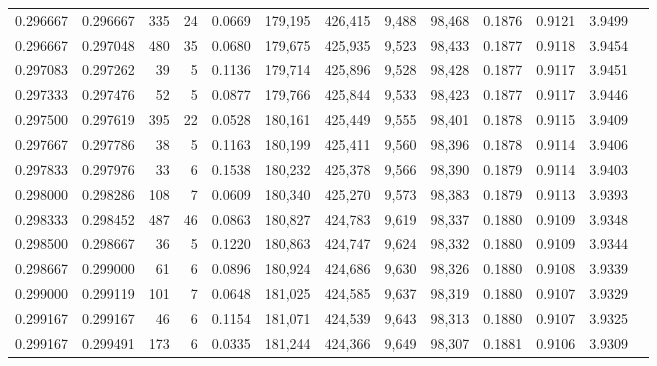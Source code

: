 \begin{tabular}{rrrrrrrrrrrrr}
0.296667 & 0.296667 &   335 &  24 &                                     0.0669 & 179,195 & 426,415 &   9,488 &  98,468 & 0.1876 & 0.9121 & 3.9499 \\
0.296667 & 0.297048 &   480 &  35 &                                     0.0680 & 179,675 & 425,935 &   9,523 &  98,433 & 0.1877 & 0.9118 & 3.9454 \\
0.297083 & 0.297262 &    39 &   5 &                                     0.1136 & 179,714 & 425,896 &   9,528 &  98,428 & 0.1877 & 0.9117 & 3.9451 \\
0.297333 & 0.297476 &    52 &   5 &                                     0.0877 & 179,766 & 425,844 &   9,533 &  98,423 & 0.1877 & 0.9117 & 3.9446 \\
0.297500 & 0.297619 &   395 &  22 &                                     0.0528 & 180,161 & 425,449 &   9,555 &  98,401 & 0.1878 & 0.9115 & 3.9409 \\
0.297667 & 0.297786 &    38 &   5 &                                     0.1163 & 180,199 & 425,411 &   9,560 &  98,396 & 0.1878 & 0.9114 & 3.9406 \\
0.297833 & 0.297976 &    33 &   6 &                                     0.1538 & 180,232 & 425,378 &   9,566 &  98,390 & 0.1879 & 0.9114 & 3.9403 \\
0.298000 & 0.298286 &   108 &   7 &                                     0.0609 & 180,340 & 425,270 &   9,573 &  98,383 & 0.1879 & 0.9113 & 3.9393 \\
0.298333 & 0.298452 &   487 &  46 &                                     0.0863 & 180,827 & 424,783 &   9,619 &  98,337 & 0.1880 & 0.9109 & 3.9348 \\
0.298500 & 0.298667 &    36 &   5 &                                     0.1220 & 180,863 & 424,747 &   9,624 &  98,332 & 0.1880 & 0.9109 & 3.9344 \\
0.298667 & 0.299000 &    61 &   6 &                                     0.0896 & 180,924 & 424,686 &   9,630 &  98,326 & 0.1880 & 0.9108 & 3.9339 \\
0.299000 & 0.299119 &   101 &   7 &                                     0.0648 & 181,025 & 424,585 &   9,637 &  98,319 & 0.1880 & 0.9107 & 3.9329 \\
0.299167 & 0.299167 &    46 &   6 &                                     0.1154 & 181,071 & 424,539 &   9,643 &  98,313 & 0.1880 & 0.9107 & 3.9325 \\
0.299167 & 0.299491 &   173 &   6 &                                     0.0335 & 181,244 & 424,366 &   9,649 &  98,307 & 0.1881 & 0.9106 & 3.9309 \\

\end{tabular}
